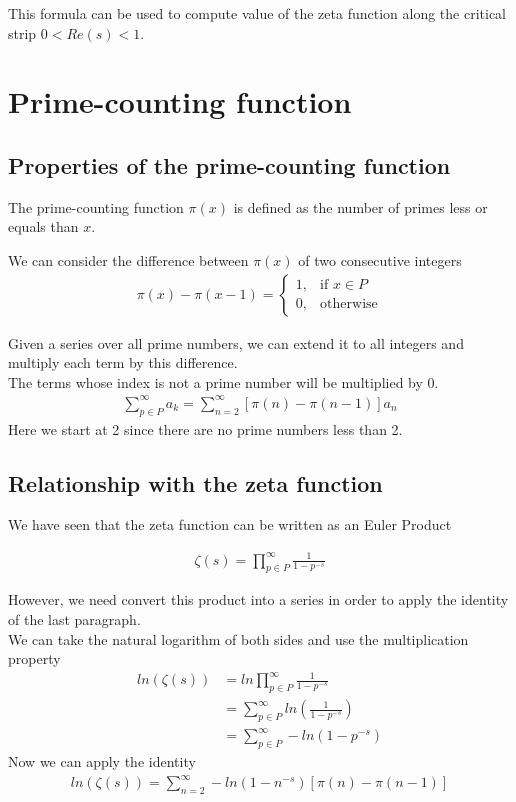 \documentclass{article}
\begin{document}
This formula can be used to compute value of the zeta function along the critical strip $0<Re(s)<1$.

\pagebreak

\section{Prime-counting function}

\subsection{Properties of the prime-counting function}

The prime-counting function $\pi (x)$ is defined as the number of primes less or equals than $x$.

We can consider the difference between $\pi (x)$ of two consecutive integers
\begin{align*}
    \pi (x)-\pi (x-1)= 
    \begin{cases}
        1,& \text{if } x\in P
        \\
        0,& \text{otherwise}
    \end{cases}
\end{align*}

Given a series over all prime numbers, we can extend it to all integers and multiply each term by this difference.
\\
The terms whose index is not a prime number will be multiplied by 0.
\begin{align*}
    \sum_{p\in P}^{\infty}a_k=\sum_{n=2}^{\infty}\left[\pi (n) - \pi (n-1)\right]a_n
\end{align*}
Here we start at 2 since there are no prime numbers less than 2.

\subsection{Relationship with the zeta function}

We have seen that the zeta function can be written as an Euler Product

\begin{align*}
    \zeta (s)=\prod_{p\in P}^{\infty}\frac{1}{1-p^{-s}}
\end{align*}

However, we need convert this product into a series in order to apply the identity of the last paragraph.
\\
We can take the natural logarithm of both sides and use the multiplication property
\begin{align*}
    ln\left(\zeta (s)\right)&=ln\prod_{p\in P}^{\infty}\frac{1}{1-p^{-s}}
    \\
    &=\sum_{p\in P}^{\infty}ln\left(\frac{1}{1-p^{-s}}\right)
    \\
    &=\sum_{p\in P}^{\infty}-ln\left(1-p^{-s}\right)
\end{align*}
Now we can apply the identity
\begin{align*}
    ln\left(\zeta (s)\right)=\sum_{n=2}^{\infty}-ln\left(1-n^{-s}\right)\left[\pi (n) - \pi (n-1)\right]
\end{align*}
\end{document}
